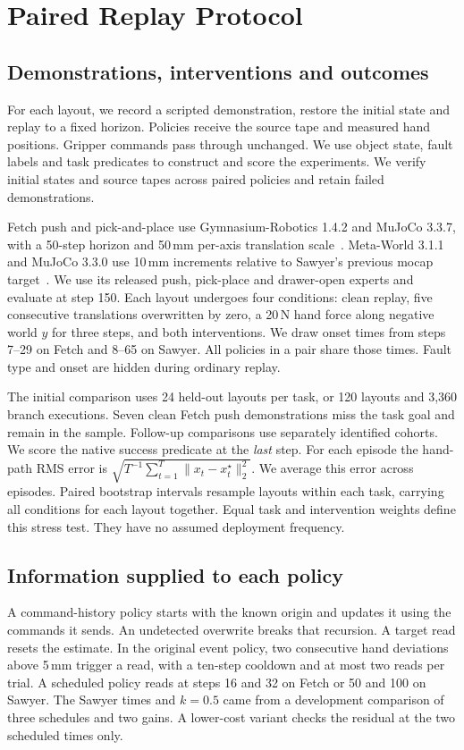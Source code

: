 \section{Paired Replay Protocol}\label{sec:protocol}
\subsection{Demonstrations, interventions and outcomes}
For each layout, we record a scripted demonstration, restore the initial state and replay to a fixed horizon. Policies receive the source tape and measured hand positions. Gripper commands pass through unchanged. We use object state, fault labels and task predicates to construct and score the experiments. We verify initial states and source tapes across paired policies and retain failed demonstrations.

Fetch push and pick-and-place use Gymnasium-Robotics 1.4.2 and MuJoCo 3.3.7, with a 50-step horizon and 50\,mm per-axis translation scale~\cite{plappert2018fetch}. Meta-World 3.1.1 and MuJoCo 3.3.0 use 10\,mm increments relative to Sawyer's previous mocap target~\cite{yu2020metaworld,mclean2025metaworld}. We use its released push, pick-place and drawer-open experts and evaluate at step 150. Each layout undergoes four conditions: clean replay, five consecutive translations overwritten by zero, a 20\,N hand force along negative world $y$ for three steps, and both interventions. We draw onset times from steps 7--29 on Fetch and 8--65 on Sawyer. All policies in a pair share those times. Fault type and onset are hidden during ordinary replay.

The initial comparison uses 24 held-out layouts per task, or 120 layouts and 3,360 branch executions. Seven clean Fetch push demonstrations miss the task goal and remain in the sample. Follow-up comparisons use separately identified cohorts. We score the native success predicate at the \emph{last} step. For each episode the hand-path RMS error is $\sqrt{T^{-1}\sum_{t=1}^{T}\|x_t-x_t^\star\|_2^2}$. We average this error across episodes. Paired bootstrap intervals resample layouts within each task, carrying all conditions for each layout together. Equal task and intervention weights define this stress test. They have no assumed deployment frequency.

\subsection{Information supplied to each policy}
A command-history policy starts with the known origin and updates it using the commands it sends. An undetected overwrite breaks that recursion. A target read resets the estimate. In the original event policy, two consecutive hand deviations above 5\,mm trigger a read, with a ten-step cooldown and at most two reads per trial. A scheduled policy reads at steps 16 and 32 on Fetch or 50 and 100 on Sawyer. The Sawyer times and $k=0.5$ came from a development comparison of three schedules and two gains. A lower-cost variant checks the residual at the two scheduled times only.

